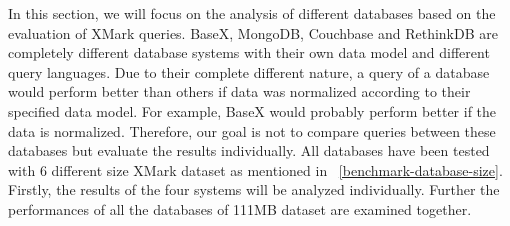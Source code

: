 In this section, we will focus on the analysis of different databases based on the  evaluation of XMark queries. BaseX, MongoDB, Couchbase and RethinkDB are completely different database systems with their own data model and different query languages.  Due to their complete different nature, a query of a database would perform better than others if data was normalized according to their specified data model. For example, BaseX would probably perform better if the data is normalized. Therefore, our goal is not to compare queries between these databases but evaluate the results individually.  All databases have been tested with 6 different size XMark dataset as mentioned in ~\ref{benchmark-database-size}. Firstly, the results  of the four systems will be analyzed individually. Further the performances of all the databases of 111MB dataset are examined together.


